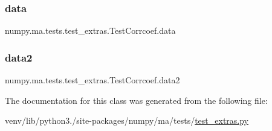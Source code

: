 \subsubsection{\texorpdfstring{data}{data}}
{\footnotesize\ttfamily numpy.\+ma.\+tests.\+test\+\_\+extras.\+Test\+Corrcoef.\+data}

\mbox{\label{classnumpy_1_1ma_1_1tests_1_1test__extras_1_1TestCorrcoef_a655680d89d8bff0ef7099ca1494cf3d9}} 
\subsubsection{\texorpdfstring{data2}{data2}}
{\footnotesize\ttfamily numpy.\+ma.\+tests.\+test\+\_\+extras.\+Test\+Corrcoef.\+data2}



The documentation for this class was generated from the following file\+:\begin{DoxyCompactItemize}
\item 
venv/lib/python3./site-\/packages/numpy/ma/tests/\hyperlink{test__extras_8py}{test\+\_\+extras.\+py}\end{DoxyCompactItemize}
